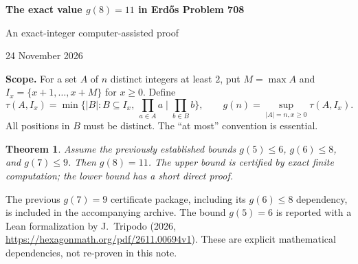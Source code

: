 \documentclass[11pt,a4paper]{article}
\newtheorem{theorem}{Theorem}
\begin{document}
\begin{center}
{\Large\bfseries The exact value $g(8)=11$ in Erd\H{o}s Problem 708}\par
\vspace{4pt}
{\large An exact-integer computer-assisted proof}\par
\vspace{5pt}
24 November 2026\par
\vspace{2pt}
\end{center}
\textbf{Scope.} For a set $A$ of $n$ distinct integers at least $2$, put $M=\max A$ and $I_x=\{x+1,\ldots,x+M\}$ for $x\ge0$. Define
\[
\tau(A,I_x)=\min\bigl\{|B|:B\subseteq I_x,\ \prod_{a\in A}a\mid\prod_{b\in B}b\bigr\},\qquad
 g(n)=\sup_{|A|=n,x\ge0}\tau(A,I_x).
\]
All positions in $B$ must be distinct. The ``at most'' convention is essential.

\begin{theorem}\label{thm:main}
Assume the previously established bounds $g(5)\le6$, $g(6)\le8$, and $g(7)\le9$. Then $g(8)=11$. The upper bound is certified by exact finite computation; the lower bound has a short direct proof.
\end{theorem}
The previous $g(7)=9$ certificate package, including its $g(6)\le8$ dependency, is included in the accompanying archive. The bound $g(5)=6$ is reported with a Lean formalization by J.~Tripodo (2026, \url{https://hexagonmath.org/pdf/2611.00694v1}). These are explicit mathematical dependencies, not re-proven in this note.
\end{document}
